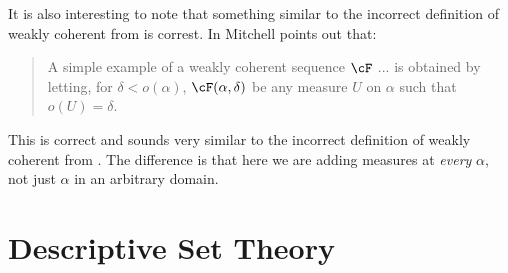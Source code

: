 \documentclass[oneside,12pt]{amsart}
\begin{document}
It is also interesting to note that something similar to the incorrect definition of weakly coherent
from \cite{BeginningInnerModelTheory} is correst. In \cite{Mitchell-Revisited} Mitchell points out
that:

\begin{quote}
A simple example of a weakly coherent sequence $\cF$ ... is obtained by letting, for $\delta<o(\alpha)$,
$\cF(\alpha,\delta)$ be any measure $U$ on $\alpha$ such that $o(U) = \delta$.
\end{quote}

This is correct and sounds very similar to the incorrect definition of weakly coherent from
\cite{BeginningInnerModelTheory}. The difference is that here we are adding measures at \emph{every}
$\alpha$, not just $\alpha$ in an arbitrary domain.



\section{Descriptive Set Theory}
\end{document}
